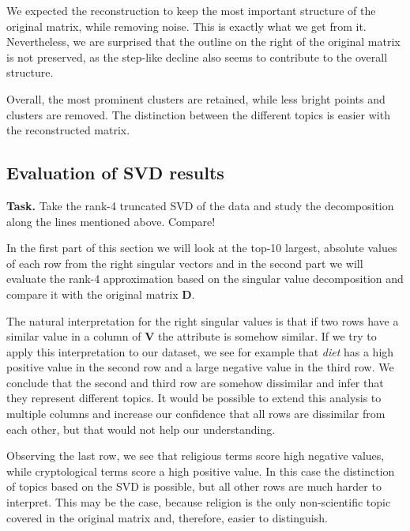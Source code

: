 \documentclass{support/acm_proc_article-sp}
\begin{document}
    We expected the reconstruction to keep the most important structure of the original matrix, while removing noise.
    This is exactly what we get from it.
    Nevertheless, we are surprised that the outline on the right of the original matrix is not preserved,
    as the step-like decline also seems to contribute to the overall structure.

    Overall, the most prominent clusters are retained, while less bright points and clusters are removed.
    The distinction between the different topics is easier with the reconstructed matrix.


    \subsection{Evaluation of SVD results}

    \textbf{Task.} Take the rank-4 truncated SVD of the data and study the decomposition along the lines mentioned above.
    Compare!

    In the first part of this section we will look at the top-10 largest, absolute values of each row from the right
    singular vectors and in the second part we will evaluate the rank-4 approximation based on the singular value
    decomposition and compare it with the original matrix $\mathbf{D}$.

    The natural interpretation for the right singular values is that if two rows have a similar value in a column of
    $\mathbf{V}$ the attribute is somehow similar.
    If we try to apply this interpretation to our dataset, we see for example that \emph{diet} has a high positive value in
    the second row and a large negative value in the third row.
    We conclude that the second and third row are somehow dissimilar and infer that they represent different topics.
    It would be possible to extend this analysis to multiple columns and increase our confidence that all rows
    are dissimilar from each other, but that would not help our understanding.

    Observing the last row, we see that religious terms score high negative values, while cryptological terms
    score a high positive value.
    In this case the distinction of topics based on the SVD is possible, but all other rows are much harder to interpret.
    This may be the case, because religion is the only non-scientific topic covered in the original matrix and,
    therefore, easier to distinguish.
\end{document}
